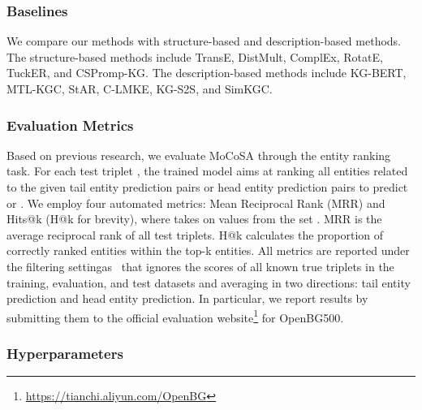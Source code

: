 \documentclass[11pt]{article}
\begin{document}
\begin{table}[ht]
\centering
{}
\caption{Overall statistics of benchmark datasets.}
\label{tab:dataset}
\end{table}

\subsubsection{Baselines} 
We compare our methods with structure-based and description-based methods. The structure-based methods include TransE, DistMult, ComplEx, RotatE, TuckER, and CSPromp-KG. The description-based methods include KG-BERT, MTL-KGC, StAR, C-LMKE, KG-S2S, and SimKGC.

\subsubsection{Evaluation Metrics}
Based on previous research, we evaluate MoCoSA through the entity ranking task. For each test triplet , the trained model aims at ranking all entities related to the given tail entity prediction pairs  or head entity prediction pairs  to predict  or . We employ four automated metrics: Mean Reciprocal Rank (MRR) and Hits@k (H@k for brevity), where  takes on values from the set . MRR is the average reciprocal rank of all test triplets. H@k calculates the proportion of correctly ranked entities within the top-k entities. All metrics are reported under the filtering settingas~\cite{Bordes2013TranslatingEF} that ignores the scores of all known true triplets in the training, evaluation, and test datasets and averaging in two directions: tail entity prediction and head entity prediction. In particular, we report results by submitting them to the official evaluation website\footnote{\url{https://tianchi.aliyun.com/OpenBG}} for OpenBG500.

\subsubsection{Hyperparameters}
\end{document}
